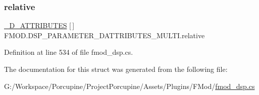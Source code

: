 \subsubsection{\texorpdfstring{relative}{relative}}
{\footnotesize\ttfamily \hyperlink{struct_f_m_o_d_1_1__3_d___a_t_t_r_i_b_u_t_e_s}{\+\_\+D\+\_\+\+A\+T\+T\+R\+I\+B\+U\+T\+ES} \mbox{[}$\,$\mbox{]} F\+M\+O\+D.\+D\+S\+P\+\_\+\+P\+A\+R\+A\+M\+E\+T\+E\+R\+\_\+D\+A\+T\+T\+R\+I\+B\+U\+T\+E\+S\+\_\+\+M\+U\+L\+T\+I.\+relative}



Definition at line 534 of file fmod\+\_\+dsp.\+cs.



The documentation for this struct was generated from the following file\+:\begin{DoxyCompactItemize}
\item 
G\+:/\+Workspace/\+Porcupine/\+Project\+Porcupine/\+Assets/\+Plugins/\+F\+Mod/\hyperlink{fmod__dsp_8cs}{fmod\+\_\+dsp.\+cs}\end{DoxyCompactItemize}
